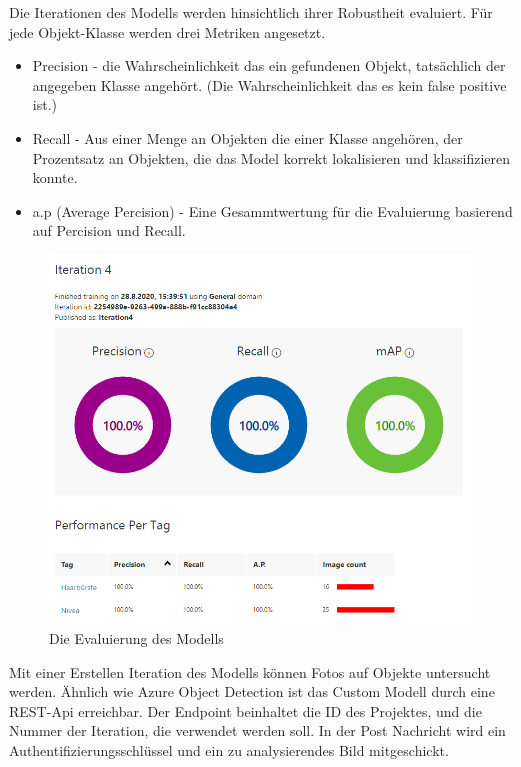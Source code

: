 Die Iterationen des Modells werden hinsichtlich ihrer Robustheit evaluiert. Für jede Objekt-Klasse werden drei Metriken angesetzt. 
\begin{itemize}
	\item Precision - die Wahrscheinlichkeit das ein gefundenen Objekt, tatsächlich der angegeben Klasse angehört. (Die Wahrscheinlichkeit das es kein false positive ist.)
	\item Recall - Aus einer Menge an Objekten die einer Klasse angehören, der Prozentsatz an Objekten, die das Model korrekt lokalisieren und klassifizieren konnte.
	\item a.p (Average Percision) - Eine Gesammtwertung für die Evaluierung basierend auf Percision und Recall. 
\end{itemize}

\begin{figure}[H]
	\centering
	\includegraphics[width=1\textwidth]{images/trainingevaluation.png}
	\caption[]{Die Evaluierung des Modells}
	\label{img:trainineval}
\end{figure}

Mit einer Erstellen Iteration des Modells können Fotos auf Objekte untersucht werden. Ähnlich wie Azure Object Detection ist das Custom Modell durch eine REST-Api erreichbar. 
Der Endpoint beinhaltet die ID des Projektes, und die Nummer der Iteration, die verwendet werden soll.
In der Post Nachricht wird ein Authentifizierungsschlüssel und ein zu analysierendes Bild mitgeschickt.

